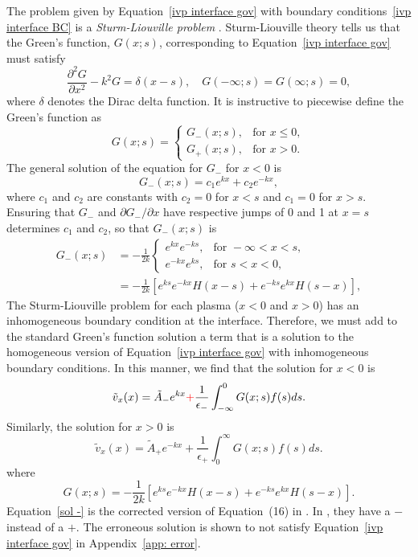 The problem given by Equation~\eqref{ivp interface gov} with boundary conditions~\eqref{ivp interface BC} is a \textit{Sturm-Liouville problem} \citep{boy_etal12}. Sturm-Liouville theory tells us that the Green's function, $G(x; s)$, corresponding to Equation~\eqref{ivp interface gov} must satisfy 
\begin{equation}
\frac{\partial^2G}{\partial x^2} - k^2 G = \delta(x-s), \quad G(-\infty; s) = G(\infty; s) = 0,
\end{equation}
where $\delta$ denotes the Dirac delta function. It is instructive to piecewise define the Green's function as
\begin{equation}
G(x; s) = 
\begin{cases}
G_-(x; s), & \text{for } x \leq 0, \\
G_+(x; s), & \text{for } x > 0.
\end{cases}
\end{equation}
The general solution of the equation for $G_-$ for $x < 0$ is
\begin{equation}
G_-(x; s) = c_1e^{kx} + c_2e^{-kx},
\end{equation}
where $c_1$ and $c_2$ are constants with $c_2 = 0$ for $x < s$ and $c_1 = 0$ for $x > s$. Ensuring that $G_-$ and $\partial G_- / \partial x$ have respective jumps of 0 and 1 at $x = s$ determines $c_1$ and $c_2$, so that $G_-(x;s)$ is
\begin{equation}
\begin{aligned}
G_-(x; s) & = -\frac{1}{2k} 
\begin{cases}
e^{kx}e^{-ks}, & \text{for } -\infty < x < s, \\
e^{-kx}e^{ks}, & \text{for } s< x < 0,
\end{cases} \\
& = - \frac{1}{2k}\left[e^{ks}e^{-kx}H(x-s) + e^{-ks}e^{kx}H(s-x)\right],
\end{aligned}
\end{equation}
The Sturm-Liouville problem for each plasma ($x < 0$ and $x > 0$) has an inhomogeneous boundary condition at the interface. Therefore, we must add to the standard Green's function solution a term that is a solution to the homogeneous version of Equation~\eqref{ivp interface gov} with inhomogeneous boundary conditions. In this manner, we find that the solution for $x < 0$ is
\begin{equation}
\tilde{v}_x(x) = \tilde{A}_-e^{kx} \textcolor{red}{+} \frac{1}{\epsilon_-}\int_{-\infty}^{0} G(x; s) f(s) ds. \label{sol -}
\end{equation}
Similarly, the solution for $x > 0$ is
\begin{equation}
\tilde{v}_x(x) = \tilde{A}_+e^{-kx} + \frac{1}{\epsilon_+}\int_{0}^{\infty} G(x; s) f(s) ds. \label{sol +}
\end{equation}
where
\begin{equation}
G(x; s) = - \frac{1}{2k}\left[e^{ks}e^{-kx}H(x-s) + e^{-ks}e^{kx}H(s-x)\right].
\end{equation}
Equation~\eqref{sol -} is the corrected version of Equation~(16) in \cite{rae_etal81}. In \cite{rae_etal81}, they have a $-$ instead of a $+$. The erroneous solution is shown to not satisfy Equation~\eqref{ivp interface gov} in Appendix~\ref{app: error}.

